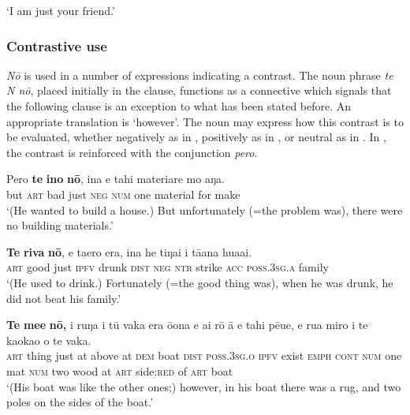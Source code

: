 \glt 
‘I am just your friend.’ \textstyleExampleref{[R308.032]} 
\z

\subsubsection[Contrastive use]{Contrastive use}\label{sec:5.8.2.4}

\textit{Nō} is used in a number of expressions indicating a contrast. The noun phrase \textit{te N nō}, placed initially in the clause, functions as a connective which signals that the following clause is an exception to what has been stated before. An appropriate translation is ‘however’. The noun may express how this contrast is to be evaluated, whether negatively as in , positively as in , or neutral as in . In , the contrast is reinforced with the  conjunction \textit{pero}.

\ea\label{ex:5.151}
\gll Pero \textbf{te} \textbf{{\ꞌ}ino} \textbf{nō}, {\ꞌ}ina e tahi materiare mo aŋa.\\
but \textsc{art} bad just \textsc{neg} \textsc{num} one material for make\\

\glt 
‘(He wanted to build a house.) But unfortunately (=the problem was), there were no building materials.’ \textstyleExampleref{[R231.156]} 
\z

\ea\label{ex:5.152}
\gll \textbf{Te} \textbf{riva} \textbf{nō}, e ta{\ꞌ}ero era, {\ꞌ}ina he tiŋa{\ꞌ}i i tā{\ꞌ}ana hua{\ꞌ}ai. \\
\textsc{art} good just \textsc{ipfv} drunk \textsc{dist} \textsc{neg} \textsc{ntr} strike \textsc{acc} \textsc{poss.3sg.a} family \\

\glt 
‘(He used to drink.) Fortunately (=the good thing was), when he was drunk, he did not beat his family.’ \textstyleExampleref{[R309.056]} 
\z

\ea\label{ex:5.153}
\gll \textbf{Te} \textbf{me{\ꞌ}e} \textbf{nō,} {\ꞌ}i ruŋa i tū vaka era ō{\ꞌ}ona e ai rō {\ꞌ}ā e tahi pē{\ꞌ}ue, e rua miro {\ꞌ}i te kaokao o te vaka. \\
\textsc{art} thing just at above at \textsc{dem} boat \textsc{dist} \textsc{poss.3sg.o} \textsc{ipfv} exist \textsc{emph} \textsc{cont} \textsc{num} one mat \textsc{num} two wood at \textsc{art} side:\textsc{red} of \textsc{art} boat \\

\glt 
‘(His boat was like the other ones;) however, in his boat there was a rug, and two poles on the sides of the boat.’ \textstyleExampleref{[R344.040]} 
\z
{}


